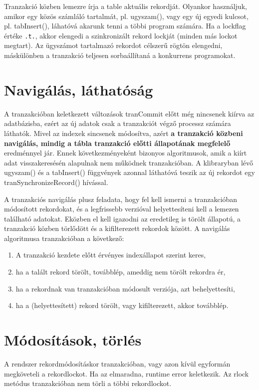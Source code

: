 Tranzakció közben lemezre írja a table aktuális rekordját.
Olyankor használjuk, amikor egy közös számláló tartalmát, pl.{} ugyszam(),
vagy egy új egyedi kulcsot, pl.{} tabInsert(), láhatóvá akarunk tenni
a többi program számára. Ha a lockflag értéke \verb!.t.!, akkor
elengedi a szinkronizált rekord lockját (minden más lockot megtart). 
Az ügyszámot tartalmazó rekordot célszerű rögtön elengedni, máskülönben 
a tranzakció teljesen sorbaállítaná a konkurrens programokat.


\section{Navigálás, láthatóság} 

A tranzakcióban keletkezett változások tranCommit előtt még nincsenek
kiírva az adatbázisba, ezért az új adatok csak a
tranzakciót végző processz számára láthatók. Mivel az indexek sincsenek
módosítva, azért {\bf a tranzakció közbeni navigálás, mindig a 
tábla tranzakció előtti állapotának megfelelő} eredménnyel jár. 
Ennek következményeként bizonyos algoritmusok, 
amik a kiírt adat visszakeresésén alapulnak nem működnek tranzakcióban. 
A klibraryban lévő ugyszam() és a tabInsert() függvények
azonnal láthatóvá teszik az új rekordot egy tranSynchronizeRecord()
hívással.

{\small
A  tranzakciós navigálás plusz feladata, hogy fel kell ismerni
a tranzakcióban módosított rekordokat, és a legfrissebb verzióval 
helyettesíteni kell a lemezen található adatokat. Eközben
el kell igazodni az eredetileg is törölt állapotú,
a tranzakció közben törlődött és a kifilterezett rekordok között.
A navigálás algoritmusa tranzakcióban a következő:

\begin{enumerate}
\item A tranzakció kezdete előtt érvényes indexállapot szerint keres,
\item ha a talált rekord törölt, továbblép, ameddig nem törölt rekordra ér,
\item ha a rekordnak van tranzakcióban módosult verziója, azt behelyettesíti,
\item ha a (helyettesített) rekord törölt, vagy kifilterezett, akkor továbblép.
\end{enumerate}
} 
 
 
\section{Módosítások, törlés}
A rendszer rekordmódosításkor tranzakcióban, vagy azon kívül
egyformán megköveteli a rekordlockot. Ha az elmaradna, runtime
error keletkezik. Az rlock metódus tranzakcióban nem törli a
többi rekordlockot.

